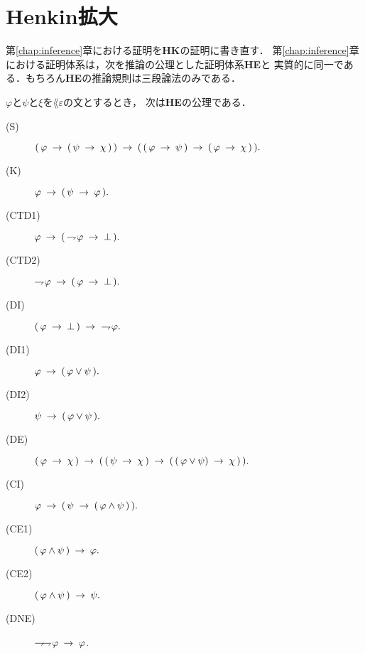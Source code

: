 \section{Henkin拡大}
	第\ref{chap:inference}章における証明を{\bf HK}の証明に書き直す．
	第\ref{chap:inference}章における証明体系は，次を推論の公理とした証明体系{\bf HE}と
	実質的に同一である．もちろん{\bf HE}の推論規則は三段論法のみである．
	
	\begin{screen}
		\begin{logicalaxm}
			$\varphi$と$\psi$と$\xi$を$\lang{\varepsilon}$の文とするとき，
			次は{\bf HE}の公理である．
			\begin{description}
				\item[(S)] $(\, \varphi \rarrow (\, \psi \rarrow \chi\, )\, ) 
					\rarrow (\, (\, \varphi \rarrow \psi\, )
					\rarrow (\, \varphi \rarrow \chi\, )\, ).$
				\item[(K)] $\varphi \rarrow (\, \psi \rarrow \varphi\, ).$
				\item[(CTD1)] $\varphi \rarrow (\, \negation \varphi \rarrow \bot\, ).$
				\item[(CTD2)] $\negation \varphi \rarrow (\, \varphi \rarrow \bot\, ).$
				\item[(DI)] $(\, \varphi \rarrow \bot\, ) \rarrow\ \negation \varphi.$
				\item[(DI1)] $\varphi \rarrow (\, \varphi \vee \psi\, ).$
				\item[(DI2)] $\psi \rarrow (\, \varphi \vee \psi\, ).$
				\item[(DE)] $(\, \varphi \rarrow \chi\, ) \rarrow 
					(\, (\, \psi \rarrow \chi\, ) 
					\rarrow (\, (\, \varphi \vee \psi) \rarrow \chi\, )\, ).$
				\item[(CI)] $\varphi \rarrow (\, \psi \rarrow (\, \varphi \wedge \psi\, )\, ).$
				\item[(CE1)] $(\, \varphi \wedge \psi\, ) \rarrow \varphi.$
				\item[(CE2)] $(\, \varphi \wedge \psi\, ) \rarrow \psi.$
				\item[(DNE)] $\negation \negation \varphi \rarrow \varphi$.
			\end{description}
		\end{logicalaxm}
	\end{screen}
	
